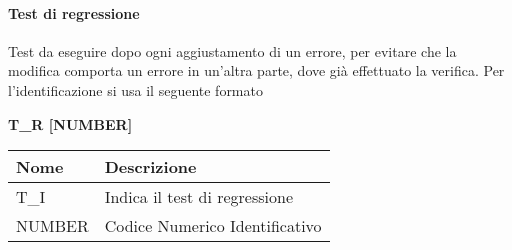 \paragraph{Test di regressione}
Test da eseguire dopo ogni aggiustamento di un errore, per evitare che la modifica comporta un errore in un’altra parte, dove già effettuato la verifica.\newline
Per l’identificazione si usa il seguente formato
\begin{center}
    \textbf{T\_R [NUMBER]}
\end{center}
\renewcommand{\arraystretch}{1.8} 
 \begin{tabular}{ |m{7em}|m{30em}| }
        \hline
        \textbf{Nome} & \textbf{Descrizione} \\
        \hline
            T\_I & Indica il test di regressione \\
        \hline
            NUMBER & Codice Numerico Identificativo \\
        \hline
 \end{tabular}
